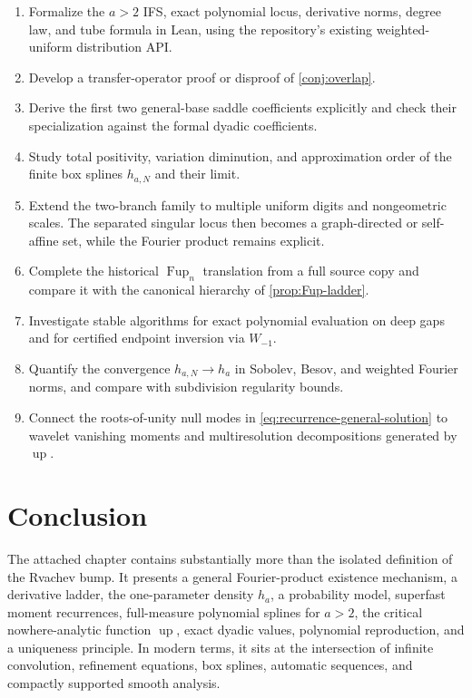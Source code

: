 \documentclass[11pt,oneside]{article}
\theoremstyle{definition}
\theoremstyle{remark}
\newcommand{\Up}{\operatorname{up}}
\begin{document}
\begin{enumerate}
\item Formalize the $a>2$ IFS, exact polynomial locus, derivative norms, degree law, and tube
      formula in Lean, using the repository's existing weighted-uniform distribution API.
\item Develop a transfer-operator proof or disproof of \cref{conj:overlap}.
\item Derive the first two general-base saddle coefficients explicitly and check their
      specialization against the formal dyadic coefficients.
\item Study total positivity, variation diminution, and approximation order of the finite
      box splines $h_{a,N}$ and their limit.
\item Extend the two-branch family to multiple uniform digits and nongeometric scales.  The
      separated singular locus then becomes a graph-directed or self-affine set, while the
      Fourier product remains explicit.
\item Complete the historical $\operatorname{Fup}_n$ translation from a full source copy and
      compare it with the canonical hierarchy of \cref{prop:Fup-ladder}.
\item Investigate stable algorithms for exact polynomial evaluation on deep gaps and for
      certified endpoint inversion via $W_{-1}$.
\item Quantify the convergence $h_{a,N}\to h_a$ in Sobolev, Besov, and weighted Fourier norms,
      and compare with subdivision regularity bounds.
\item Connect the roots-of-unity null modes in \eqref{eq:recurrence-general-solution} to
      wavelet vanishing moments and multiresolution decompositions generated by $\Up$.
\end{enumerate}

\section{Conclusion}

The attached chapter contains substantially more than the isolated definition of the
Rvachev bump.  It presents a general Fourier-product existence mechanism, a derivative
ladder, the one-parameter density $h_a$, a probability model, superfast moment recurrences,
full-measure polynomial splines for $a>2$, the critical nowhere-analytic function $\Up$,
exact dyadic values, polynomial reproduction, and a uniqueness principle.  In modern terms,
it sits at the intersection of infinite convolution, refinement equations, box splines,
automatic sequences, and compactly supported smooth analysis.
\end{document}
